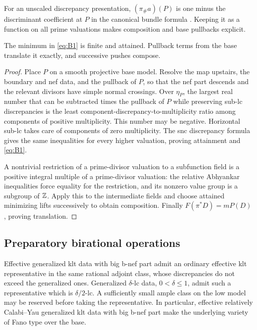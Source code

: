 For an unscaled discrepancy presentation, \((\pi_\#a)(P)\) is one
minus the discriminant coefficient at \(P\) in the canonical bundle
formula \cite[Section~2]{FilipazziGeneralized}. Keeping it as a
function on all prime valuations makes composition and base pullbacks
explicit.

\begin{lemma}\label{b:push-threshold}
The minimum in \eqref{eq:B1} is finite and attained. Pullback terms
from the base translate it exactly, and successive pushes compose.
\end{lemma}

\begin{proof}
Place \(P\) on a smooth projective base model. Resolve the map upstairs,
the boundary and nef data, and the pullback of \(P\), so that the nef
part descends and the relevant divisors have simple normal crossings.
Over \(\eta_P\), the largest real number that can be subtracted times
the pullback of \(P\) while preserving sub-lc discrepancies is the
least component-discrepancy-to-multiplicity ratio among components
of positive multiplicity. This number may be negative. Horizontal
sub-lc takes care of components of zero multiplicity. The snc
discrepancy formula gives the same inequalities for every higher
valuation, proving attainment and \eqref{eq:B1}.

A nontrivial restriction of a prime-divisor valuation to a subfunction
field is a positive integral multiple of a prime-divisor valuation:
the relative Abhyankar inequalities force equality for the restriction,
and its nonzero value group is a subgroup of \(\mathbb Z\).
Apply this to the intermediate fields and choose attained minimizing
lifts successively to obtain composition.
Finally \(F(\pi^*D)=mP(D)\), proving translation.
\end{proof}

\subsection{Preparatory birational operations}

\begin{lemma}\label{b:ordinary-approximation}
Effective generalized klt data with big b-nef part admit an ordinary
effective klt representative in the same rational adjoint class, whose
discrepancies do not exceed the generalized ones. Generalized
\(\delta\)-lc data, \(0<\delta\le1\), admit such a representative which
is \(\delta/2\)-lc. A sufficiently small ample class on the low model
may be reserved before taking the representative. In particular,
effective relatively Calabi--Yau generalized klt data with big b-nef
part make the underlying variety of Fano type over the base.
\end{lemma}

